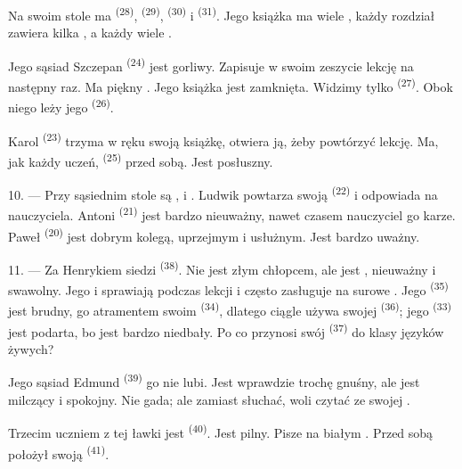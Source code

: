 Na swoim stole ma  \textsuperscript{(28)}, 
\textsuperscript{(29)},  \textsuperscript{(30)} i 
\textsuperscript{(31)}. Jego książka ma wiele , każdy rozdział zawiera
kilka , a każdy  wiele .

Jego sąsiad Szczepan \textsuperscript{(24)} jest gorliwy. Zapisuje w swoim zeszycie
lekcję na następny raz. Ma piękny . Jego książka jest
zamknięta. Widzimy tylko  \textsuperscript{(27)}. Obok niego leży jego
 \textsuperscript{(26)}.

Karol \textsuperscript{(23)} trzyma w ręku swoją książkę, otwiera ją, żeby powtórzyć
lekcję. Ma, jak każdy uczeń,  \textsuperscript{(25)} przed sobą. Jest
posłuszny.

10. --- Przy sąsiednim stole są ,  i .
Ludwik powtarza swoją  \textsuperscript{(22)} i odpowiada na
 nauczyciela. Antoni \textsuperscript{(21)} jest bardzo nieuważny, nawet
czasem nauczyciel go karze. Paweł \textsuperscript{(20)} jest dobrym kolegą, uprzejmym i
usłużnym. Jest bardzo uważny.

\VUsaut{4.2mm}
\VUsaut{3.2mm}

11. --- Za Henrykiem siedzi  \textsuperscript{(38)}. Nie jest złym
chłopcem, ale jest , nieuważny i swawolny. Jego 
i  sprawiają  podczas lekcji i często zasługuje
na surowe . Jego  \textsuperscript{(35)} jest brudny,
 go atramentem swoim  \textsuperscript{(34)}, dlatego ciągle
używa swojej  \textsuperscript{(36)}; jego 
\textsuperscript{(33)} jest podarta, bo jest bardzo niedbały. Po co przynosi swój
 \textsuperscript{(37)} do klasy języków żywych?

Jego sąsiad Edmund \textsuperscript{(39)} go nie lubi. Jest wprawdzie trochę gnuśny, ale
jest milczący i spokojny. Nie gada; ale zamiast słuchać, woli czytać
 ze swojej .

Trzecim uczniem z tej ławki jest  \textsuperscript{(40)}. Jest pilny.
Pisze na białym . Przed sobą położył swoją
 \textsuperscript{(41)}.

